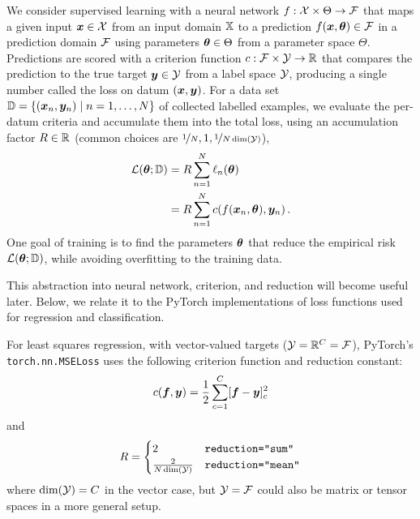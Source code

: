 We consider supervised learning with a neural network $f: {\mathcal{X}} \times \Theta \to {\mathcal{F}}$ that maps a given input ${\bm{x}} \in {\mathcal{X}}$ from an input domain ${\mathbb{X}}$ to a prediction $f({\bm{x}}, {\bm{\theta}}) \in {\mathcal{F}}$ in a prediction domain ${\mathcal{F}}$ using parameters ${\bm{\theta}} \in \Theta$ from a parameter space $\Theta$.
Predictions are scored with a criterion function $c: {\mathcal{F}} \times {\mathcal{Y}} \to {\mathbb{R}}$ that compares the prediction to the true target ${\bm{y}} \in {\mathcal{Y}}$ from a label space ${\mathcal{Y}}$, producing a single number called the loss on datum $({\bm{x}}, {\bm{y}})$.
For a data set ${\mathbb{D}} = \{({\bm{x}}_n, {\bm{y}}_n) \mid n=1, \dots, N\}$ of collected labelled examples, we evaluate the per-datum criteria and accumulate them into the total loss, using an accumulation factor $R \in {\mathbb{R}}$ (common choices are $\nicefrac{1}{N}, 1, \nicefrac{1}{N \dim({\mathcal{Y}})}$),
\begin{align}\label{eq:empirical_risk}
  \begin{split}
    {\mathcal{L}}({\bm{\theta}}; {\mathbb{D}}) &= R \sum_{n=1}^N \ell_n({\bm{\theta}})
    \\
                      &= R \sum_{n=1}^N c(f({\bm{x}}_n, {\bm{\theta}}), {\bm{y}}_n)\,.
  \end{split}
\end{align}
One goal of training is to find the parameters ${\bm{\theta}}$ that reduce the empirical risk ${\mathcal{L}}({\bm{\theta}}; {\mathbb{D}})$, while avoiding overfitting to the training data.

This abstraction into neural network, criterion, and reduction will become useful later.
Below, we relate it to the PyTorch implementations of loss functions used for regression and classification.

\begin{example}\label{ex:square_loss}
  For least squares regression, with vector-valued targets (${\mathcal{Y}} = {\mathbb{R}}^C = {\mathcal{F}}$), PyTorch's \texttt{torch.nn.MSELoss} uses the following criterion function and reduction constant:
  \begin{align*}
    c({\bm{f}}, {\bm{y}})
    =
    \frac{1}{2}\sum_{c=1}^C [{\bm{f}} - {\bm{y}}]_c^2
  \end{align*}
  and
  \begin{align*}
    R
    =
    \begin{cases}
      2 & \text{\texttt{reduction="sum"}}
      \\
      \frac{2}{N \dim({\mathcal{Y}})} & \text{\texttt{reduction="mean"}}
    \end{cases}
  \end{align*}
  where $\dim({\mathcal{Y}}) = C$ in the vector case, but ${\mathcal{Y}} = {\mathcal{F}}$ could also be matrix or tensor spaces in a more general setup.
\end{example}

